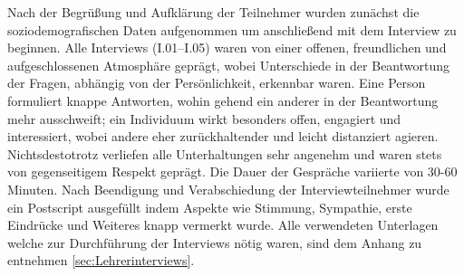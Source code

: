 Nach der Begrüßung und Aufklärung der Teilnehmer wurden zunächst die soziodemografischen Daten aufgenommen um anschließend mit dem Interview zu beginnen. Alle Interviews (I.01--I.05)  waren von einer offenen, freundlichen und aufgeschlossenen Atmosphäre geprägt, wobei Unterschiede in der Beantwortung der Fragen, abhängig von der Persönlichkeit, erkennbar waren. Eine Person formuliert knappe Antworten, wohin gehend ein anderer in der Beantwortung mehr ausschweift; ein Individuum wirkt besonders offen, engagiert und interessiert, wobei andere eher zurückhaltender und leicht distanziert agieren. Nichtsdestotrotz verliefen alle Unterhaltungen sehr angenehm und waren stets von gegenseitigem Respekt geprägt. Die Dauer der Gespräche variierte von 30-60 Minuten. Nach Beendigung und Verabschiedung der Interviewteilnehmer wurde ein Postscript ausgefüllt indem Aspekte wie Stimmung, Sympathie, erste Eindrücke und Weiteres knapp vermerkt wurde. Alle verwendeten Unterlagen welche zur Durchführung der Interviews nötig waren, sind dem Anhang zu entnehmen \ref{sec:Lehrerinterviews}.


